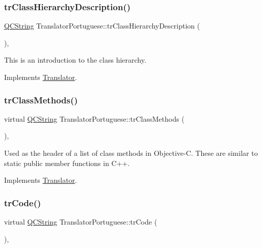 \subsubsection{\texorpdfstring{trClassHierarchyDescription()}{trClassHierarchyDescription()}}
{\footnotesize\ttfamily \mbox{\hyperlink{class_q_c_string}{Q\+C\+String}} Translator\+Portuguese\+::tr\+Class\+Hierarchy\+Description (\begin{DoxyParamCaption}{ }\end{DoxyParamCaption})\hspace{0.3cm}{\ttfamily [inline]}, {\ttfamily [virtual]}}

This is an introduction to the class hierarchy. 

Implements \mbox{\hyperlink{class_translator}{Translator}}.

\mbox{\label{class_translator_portuguese_ae486f9961399c366a846cfced46b2c3a}} 
\subsubsection{\texorpdfstring{trClassMethods()}{trClassMethods()}}
{\footnotesize\ttfamily virtual \mbox{\hyperlink{class_q_c_string}{Q\+C\+String}} Translator\+Portuguese\+::tr\+Class\+Methods (\begin{DoxyParamCaption}{ }\end{DoxyParamCaption})\hspace{0.3cm}{\ttfamily [inline]}, {\ttfamily [virtual]}}

Used as the header of a list of class methods in Objective-\/C. These are similar to static public member functions in C++. 

Implements \mbox{\hyperlink{class_translator}{Translator}}.

\mbox{\label{class_translator_portuguese_a127bc0fed927b35fe141bee2793f2c78}} 
\subsubsection{\texorpdfstring{trCode()}{trCode()}}
{\footnotesize\ttfamily virtual \mbox{\hyperlink{class_q_c_string}{Q\+C\+String}} Translator\+Portuguese\+::tr\+Code (\begin{DoxyParamCaption}{ }\end{DoxyParamCaption})\hspace{0.3cm}{\ttfamily [inline]}, {\ttfamily [virtual]}}

